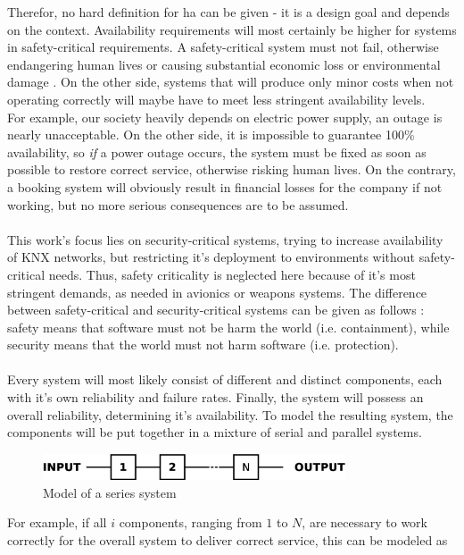Therefor, no hard definition for \gls{ha} can be given - it is a design goal and depends on the context. Availability requirements will most certainly be higher
for systems in safety-critical requirements. A safety-critical system must not fail, otherwise endangering human lives or 
causing substantial economic loss or environmental damage \cite{1007998}.
On the other side, systems that will produce only minor costs when not operating correctly
will maybe have to meet less stringent availability levels.
\\
For example, our society heavily depends on electric power supply, an outage
is nearly unacceptable. On the other side, it is impossible to guarantee 100\% availability, so \textit{if} a power outage occurs, the system must be fixed as soon as
possible to restore correct service, otherwise risking human lives. On the contrary, a booking system will obviously result in financial losses for the company 
if not working, but no more serious consequences are to be assumed.
\\
\\
This work's focus lies on security-critical systems, trying to increase availability of KNX networks, but restricting it's deployment to
environments without safety-critical needs. Thus, safety criticality is neglected here because of it's most stringent demands, as needed in avionics
or weapons systems.
The difference between safety-critical and security-critical systems can be given as follows \cite{5784222}: safety means that software must not be harm the 
world (i.e. containment), while security means that the world must not harm software (i.e. protection). 
\\
\\
Every system will most likely consist of different and distinct components, each with it's own reliability and failure rates. Finally, the system
will possess an overall reliability, determining it's availability. To model the resulting system, the components will be put together in a mixture of
serial and parallel systems.
\begin{figure}
    \centering
    \includegraphics[width=0.8\textwidth]{figures/seriesSystem.eps}
    \caption{Model of a series system}
    \label{fig:serSys}
\end{figure}
For example, if all $i$ components, ranging from $1$ to $N$, are necessary to work correctly for the overall system to deliver correct service, this can be modeled as
